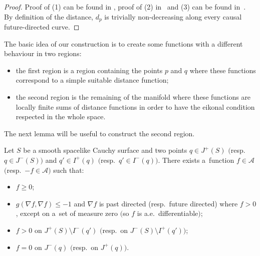 \begin{proof}
Proof of (1) can be found in \cite{Beem,ONeill}, proof of (2) in~\cite{EGK} and (3) can be found in~\cite{Mor}. By def\/inition of the distance, $d_p$ is trivially non-decreasing along every causal future-directed curve.
\end{proof}

The basic idea of our construction is to create some functions with a dif\/ferent behaviour in two regions:
\begin{itemize}\itemsep=0pt
\item the f\/irst region is a region containing the points $p$ and $q$ where these functions correspond to a simple suitable distance function;
\item the second region is the remaining of the manifold where these functions are locally f\/inite sums of distance functions in order to have the eikonal condition respected in the whole space.
\end{itemize}

The next lemma will be useful to construct the second region.

\begin{lemma}\label{lemmaprincipal}
Let $S$ be a smooth spacelike Cauchy surface and two points $q \in J^+(S)$ $($resp.\ $q \in J^-(S))$ and $q' \in I^+(q)$ $($resp.\ $q' \in I^-(q))$. There exists a~function $f \in \mathcal A$ $($resp.\ $-f \in \mathcal A)$ such that:
\begin{itemize}\itemsep=0pt
\item $f \geq 0 $;
\item $g( \nabla f, \nabla f ) \leq -1$ and $\nabla f$ is past directed (resp.\ future directed) where $f > 0$, except on a~set of measure zero $($so $f$ is a.e.\ differentiable$)$;
\item $f > 0$ on $J^+(S) \setminus I^-(q')$ $($resp.\ on $J^-(S) \setminus I^+(q'))$;
\item $f = 0$ on $J^-(q)$ $($resp.\ on $J^+(q))$.
\end{itemize}
\end{lemma}

